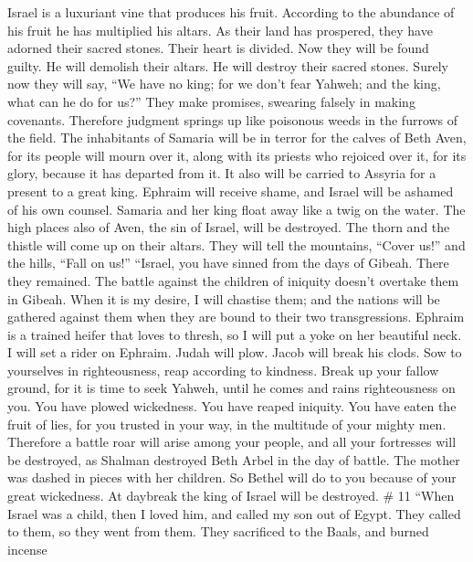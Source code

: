 Israel is a luxuriant vine that produces his fruit.
According to the abundance of his fruit he has multiplied his altars. As
their land has prospered, they have adorned their sacred stones.
 Their heart is divided. Now they will be found guilty. He
will demolish their altars. He will destroy their sacred stones.
 Surely now they will say, ``We have no king; for we don't
fear Yahweh; and the king, what can he do for us?''  They
make promises, swearing falsely in making covenants. Therefore judgment
springs up like poisonous weeds in the furrows of the field.
 The inhabitants of Samaria will be in terror for the calves
of Beth Aven, for its people will mourn over it, along with its priests
who rejoiced over it, for its glory, because it has departed from it.
 It also will be carried to Assyria for a present to a great
king. Ephraim will receive shame, and Israel will be ashamed of his own
counsel.  Samaria and her king float away like a twig on the
water.  The high places also of Aven, the sin of Israel,
will be destroyed. The thorn and the thistle will come up on their
altars. They will tell the mountains, ``Cover us!'' and the hills,
``Fall on us!''  ``Israel, you have sinned from the days of
Gibeah. There they remained. The battle against the children of iniquity
doesn't overtake them in Gibeah.  When it is my desire, I
will chastise them; and the nations will be gathered against them when
they are bound to their two transgressions.  Ephraim is a
trained heifer that loves to thresh, so I will put a yoke on her
beautiful neck. I will set a rider on Ephraim. Judah will plow. Jacob
will break his clods.  Sow to yourselves in righteousness,
reap according to kindness. Break up your fallow ground, for it is time
to seek Yahweh, until he comes and rains righteousness on you.
 You have plowed wickedness. You have reaped iniquity. You
have eaten the fruit of lies, for you trusted in your way, in the
multitude of your mighty men.  Therefore a battle roar will
arise among your people, and all your fortresses will be destroyed, as
Shalman destroyed Beth Arbel in the day of battle. The mother was dashed
in pieces with her children.  So Bethel will do to you
because of your great wickedness. At daybreak the king of Israel will be
destroyed. \# 11  ``When Israel was a child, then I loved
him, and called my son out of Egypt.  They called to them,
so they went from them. They sacrificed to the Baals, and burned incense
